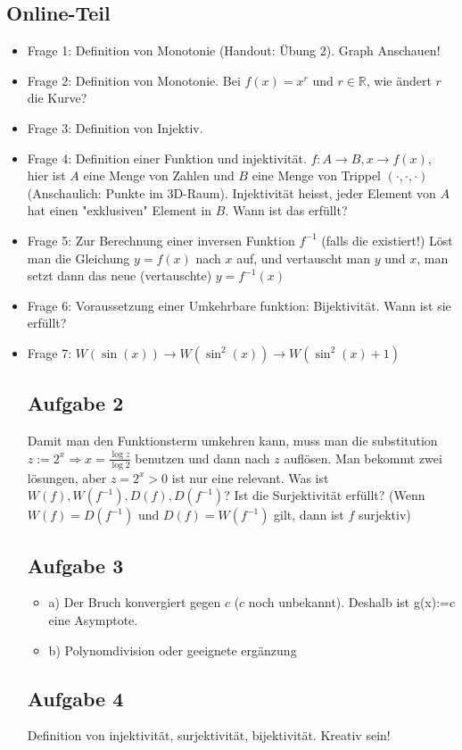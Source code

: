 \documentclass[11pt]{article} %
\begin{document}
\subsection{Online-Teil}
\begin{itemize}
\item Frage 1: Definition von Monotonie (Handout: Übung 2). Graph Anschauen!
\item Frage 2: Definition von Monotonie. Bei $f(x) = x^r$ und $r \in \mathbb{R}$, wie ändert $r$ die Kurve? 
\item Frage 3: Definition von Injektiv. 
\item Frage 4: Definition einer Funktion und injektivität. $f: A \rightarrow B, x\rightarrow f(x)$, hier ist $A$ eine Menge von Zahlen und $B$ eine Menge von Trippel $(\cdot, \cdot, \cdot)$ (Anschaulich: Punkte im 3D-Raum). Injektivität heisst, jeder Element von $A$ hat einen "exklusiven" Element in $B$. Wann ist das erfüllt?
\item Frage 5: Zur Berechnung einer inversen Funktion $f^{-1}$ (falls die existiert!) Löst man die Gleichung $y = f(x)$ nach $x$ auf, und vertauscht man $y$ und $x$, man setzt dann das neue (vertauschte) $y = f^{-1}(x)$
\item Frage 6: Voraussetzung einer Umkehrbare funktion: Bijektivität. Wann ist sie erfüllt?
\item Frage 7: $W(\sin(x)) \rightarrow W(\sin^2(x)) \rightarrow W(\sin^2(x) + 1)$

\subsection{Aufgabe 2}
Damit man den Funktionsterm umkehren kann, muss man die substitution $z := 2^x \Rightarrow x = \frac{\log z}{\log 2}$ benutzen und dann nach $z$ auflösen. Man bekommt zwei lösungen, aber $z = 2^x > 0$ ist nur eine relevant. Was ist $W(f), W(f^{-1}), D(f), D(f^{-1})$? Ist die Surjektivität erfüllt? (Wenn $W(f) = D(f^{-1})$ und $D(f)=W(f^{-1})$ gilt, dann ist $f$ surjektiv) 
\subsection{Aufgabe 3}
\begin{itemize}
\item a) Der Bruch konvergiert gegen $c$ ($c$ noch unbekannt). Deshalb ist g(x):=c eine Asymptote.
\item b) Polynomdivision oder geeignete ergänzung 
\end{itemize}
\subsection{Aufgabe 4}
Definition von injektivität, surjektivität, bijektivität. Kreativ sein!
\end{itemize}
\end{document}
